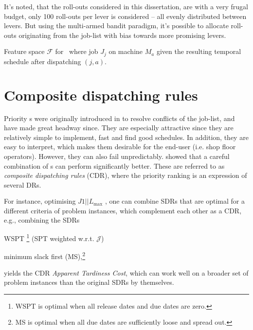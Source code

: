 It's noted, that the roll-outs considered in this dissertation, are with a very 
frugal budget, only 100 roll-outs per lever is considered -- all evenly 
distributed between levers. But using the multi-armed bandit paradigm, it's 
possible to allocate roll-outs originating from the job-list with bias towards 
more promising levers.

\begin{table} \centering 
	\caption[Feature space $\mathcal{F}$ for \JSP]{Feature space $\mathcal{F}$ 
	for \JSP\ where job $J_j$ on machine $M_a$ given the resulting temporal 
	schedule after dispatching $(j,a)$.}
	\label{tbl:features}
	
\end{table}

\section{Composite dispatching rules}\label{sec:CDR}

Priority \dr s were originally introduced in \citet{Giffler60} to resolve 
conflicts of the job-list, and have made great headway since. 
They are especially attractive since they are relatively simple to 
implement, fast and find good schedules. In addition, they are easy 
to interpret, which makes them desirable for the end-user (i.e. shop floor 
operators). 
However, they can also fail unpredictably. 
\citet{Jayamohan04} showed that a careful combination of \dr s can 
perform significantly better. These are referred to as \emph{composite 
dispatching rules} (CDR), where the priority ranking is an expression of 
several DRs. 

For instance, optimising $J1||L_{\max}$ \cite[see. chapter 14.2]{Pinedo08}, one 
can combine SDRs that are optimal for a different criteria of problem 
instances, which complement each other as a CDR, e.g., combining the SDRs 
\begin{enumerate*}[after={{}}]
    \item WSPT \footnote{WSPT is optimal when all release dates and due dates 
    are zero.} (SPT weighted w.r.t. $\mathcal{J}$)
    \item minimum slack first (MS),\footnote{MS is optimal when all due dates 
    are sufficiently loose and spread out.} 
\end{enumerate*}
yields the CDR \emph{Apparent Tardiness Cost}, which can work well on a 
broader set of problem instances than the original SDRs by themselves.


